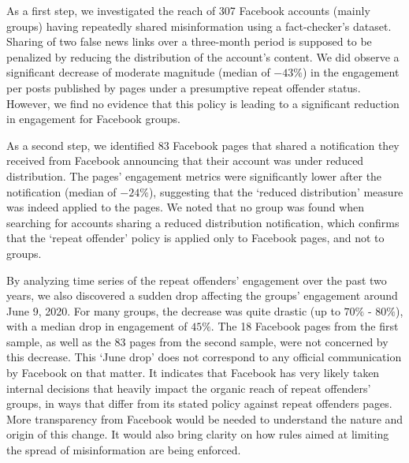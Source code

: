 \documentclass[11pt,a4paper]{article}
\begin{document}
As a first step, we investigated the reach of 307 Facebook accounts (mainly groups) having repeatedly shared misinformation using a fact-checker's dataset. 
Sharing of two false news links over a three-month period is supposed to be penalized by reducing the distribution of the account's content. 
We did observe a significant decrease of moderate magnitude (median of $-43\%$) in the engagement per posts published by pages under a presumptive repeat offender status.
However, we find no evidence that this policy is leading to a significant reduction in engagement for Facebook groups.
 
As a second step, we identified 83 Facebook pages that shared a notification they received from Facebook announcing that their account was under reduced distribution.
The pages' engagement metrics were significantly lower after the notification (median of $-24\%$), suggesting that the `reduced distribution' measure was indeed applied to the pages.
We noted that no group was found when searching for accounts sharing a reduced distribution notification, which confirms that the `repeat offender' policy is applied only to Facebook pages, and not to groups.

By analyzing time series of the repeat offenders’ engagement over the past two years, we also discovered a sudden drop affecting the groups’ engagement around June 9, 2020.
For many groups, the decrease was quite drastic (up to $70\%$ - $80\%$), with a median drop in engagement of $45\%$.
The 18 Facebook pages from the first sample, as well as the 83 pages from the second sample, were not concerned by this decrease.
This `June drop' does not correspond to any official communication by Facebook on that matter. 
It indicates that Facebook has very likely taken internal decisions that heavily impact the organic reach of repeat offenders' groups, in ways that differ from its stated policy against repeat offenders pages.
More transparency from Facebook would be needed to understand the nature and origin of this change. 
It would also bring clarity on how rules aimed at limiting the spread of misinformation are being enforced.
\end{document}
